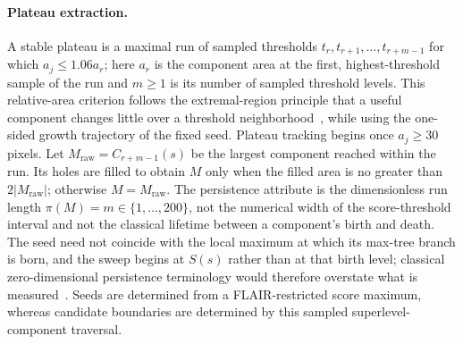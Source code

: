 \documentclass[11pt,a4paper]{article}
\begin{document}
\paragraph{Plateau extraction.}
A stable plateau is a maximal run of sampled thresholds
$t_r,t_{r+1},\ldots,t_{r+m-1}$ for which
$a_j\le1.06a_r$; here $a_r$ is the component area at the first, highest-threshold
sample of the run and $m\ge1$ is its number of sampled threshold levels.
This relative-area criterion follows the extremal-region principle that a useful
component changes little over a threshold neighborhood~\cite{matas2004}, while
using the one-sided growth trajectory of the fixed seed. Plateau tracking begins
once $a_j\ge30$ pixels. Let $M_{\mathrm{raw}}=C_{r+m-1}(s)$ be the largest
component reached within the run. Its holes are filled to obtain $M$ only when
the filled area is no greater than $2|M_{\mathrm{raw}}|$; otherwise
$M=M_{\mathrm{raw}}$. The persistence attribute is
the dimensionless run length
$\pi(M)=m\in\{1,\ldots,200\}$, not the numerical width of the score-threshold
interval and not the classical lifetime between a component's birth and death.
The seed need not coincide with the local maximum at which its max-tree branch
is born, and the sweep begins at $S(s)$ rather than at that birth level; classical
zero-dimensional persistence terminology would therefore overstate what is
measured~\cite{edelsbrunner2002}. Seeds are determined from a FLAIR-restricted
score maximum, whereas candidate boundaries are determined by this sampled
superlevel-component traversal.
\end{document}
